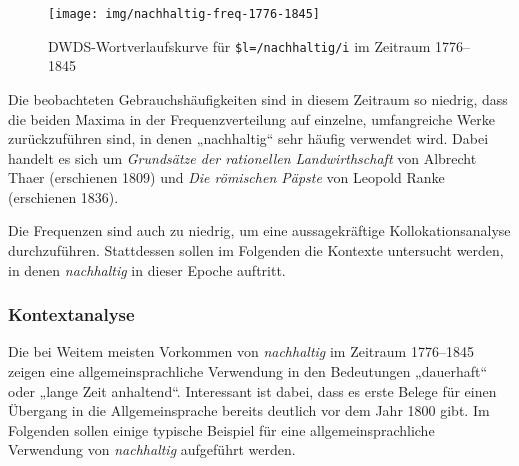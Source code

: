 \documentclass[
    german,
    a4paper,%
    12pt,%
    oneside,%
    toc=bibliography,
    final,
]{scrartcl}
\begin{document}
\begin{figure}[h!]
	\centering
	
	\texttt{[image: img/nachhaltig-freq-1776-1845]}
	\caption[corpus-size]{DWDS-Wortverlaufskurve für \lstinline|$l=/nachhaltig/i| im Zeitraum 1776–1845\protect\footnotemark}
	\label{fig:nachhaltig-freq-1776-1845}
\end{figure}

Die beobachteten Gebrauchshäufigkeiten sind in diesem Zeitraum so niedrig, dass die beiden Maxima in der Frequenzverteilung auf einzelne, umfangreiche Werke zurückzuführen sind, in denen „nachhaltig“ sehr häufig verwendet wird. Dabei handelt es sich um \textit{Grundsätze der rationellen Landwirthschaft} von Albrecht Thaer (erschienen 1809) und \textit{Die römischen Päpste} von Leopold Ranke (erschienen 1836).

Die Frequenzen sind auch zu niedrig, um eine aussagekräftige Kollokationsanalyse durchzuführen. Stattdessen sollen im Folgenden die Kontexte untersucht werden, in denen \textit{nachhaltig} in dieser Epoche auftritt.

\subsubsection{Kontextanalyse}

Die bei Weitem meisten Vorkommen von \textit{nachhaltig} im Zeitraum 1776–1845 zeigen eine allgemeinsprachliche Verwendung in den Bedeutungen „dauerhaft“ oder „lange Zeit anhaltend“. Interessant ist dabei, dass es erste Belege für einen Übergang in die Allgemeinsprache bereits deutlich vor dem Jahr 1800 gibt. Im Folgenden sollen einige typische Beispiel für eine allgemeinsprachliche Verwendung von \textit{nachhaltig} aufgeführt werden.
\end{document}
